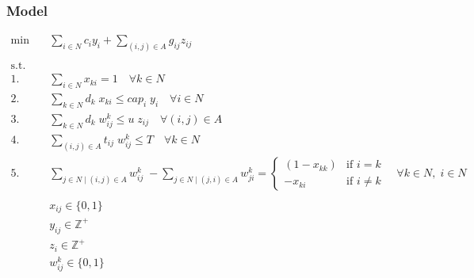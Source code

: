 \subsubsection*{Model}

\begin{align*}
    \min \quad & \sum_{i \in N} c_i y_i + \sum_{(i, j) \in A} g_{ij} z_{ij} & \\
	\\
    \text{s.t.} \quad &  \\
	1. \quad & \sum_{i \in N} x_{ki} = 1 \quad \forall k \in N  \\
	2. \quad & \sum_{k \in N} d_k \; x_{ki} \le cap_i \; y_i \quad \forall i \in N  \\
	3. \quad & \sum_{k \in N} d_k \; w_{ij}^k \le u \; z_{ij} \quad \forall (i, j) \in A \quad  \\
	4. \quad & \sum_{(i, j) \in A} t_{ij} \; w_{ij}^k \le T \quad \forall k \in N  \\
	5. \quad & \sum_{j \in N \mid (i, j) \in A} w_{ij}^k \; - \sum_{j \in N \mid (j, i) \in A} w_{ji}^k = \left\{
	\begin{array}{rl}
		(1 - x_{kk}) & \text{if } i = k  \\
		-x_{ki} & \text{if } i \ne k
	\end{array}
	\right.
	\quad \forall k \in N, \; i \in N  \\
	\\
	& x_{ij} \in \{0, 1\}  \\
	& y_{ij} \in \mathbb{Z}^+  \\
	& z_i \in \mathbb{Z}^+  \\
	& w_{ij}^k \in \{0, 1\}
\end{align*}
